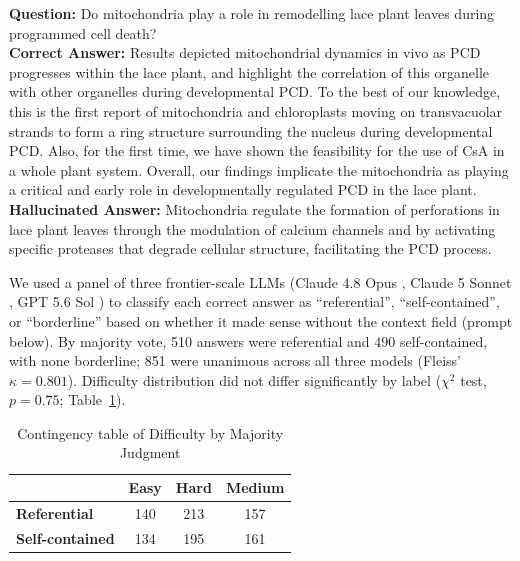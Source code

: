 \documentclass{article}
\begin{document}
\begin{tcolorbox}[title=Example of a referential answer from MedHallu]
\small
\label{referential_example}
\textbf{Question:} Do mitochondria play a role in remodelling lace plant leaves during programmed cell death? \\[4pt]
\textbf{Correct Answer:} Results depicted mitochondrial dynamics in vivo as PCD progresses within the lace plant, and highlight the correlation of this organelle with other organelles during developmental PCD. To the best of our knowledge, this is the first report of mitochondria and chloroplasts moving on transvacuolar strands to form a ring structure surrounding the nucleus during developmental PCD. Also, for the first time, we have shown the feasibility for the use of CsA in a whole plant system. Overall, our findings implicate the mitochondria as playing a critical and early role in developmentally regulated PCD in the lace plant. \\[4pt]
\textbf{Hallucinated Answer:} Mitochondria regulate the formation of perforations in lace plant leaves through the modulation of calcium channels and by activating specific proteases that degrade cellular structure, facilitating the PCD process.
\end{tcolorbox}

We used a panel of three frontier-scale LLMs (Claude 4.8 Opus \citep{Anthropic2026Opus48}, Claude 5 Sonnet \citep{Anthropic2026Sonnet5}, GPT 5.6 Sol \citep{OpenAI2026GPT56}) to classify each correct answer as ``referential'', ``self-contained'', or ``borderline'' based on whether it made sense without the context field (prompt below). By majority vote, 510 answers were referential and 490 self-contained, with none borderline; 851 were unanimous across all three models (Fleiss' $\kappa=0.801$). Difficulty distribution did not differ significantly by label ($\chi^2$ test, $p=0.75$; Table~\ref{tab:contingency}).

\begin{table}[h!]
\centering
\begin{tabular}{lccc}
\hline
 & \textbf{Easy} & \textbf{Hard} & \textbf{Medium} \\
\hline
\textbf{Referential}      & 140 & 213 & 157 \\
\textbf{Self-contained}   & 134 & 195 & 161 \\
\hline
\end{tabular}
\caption{Contingency table of Difficulty by Majority Judgment}
\label{tab:contingency}
\end{table}
\end{document}
